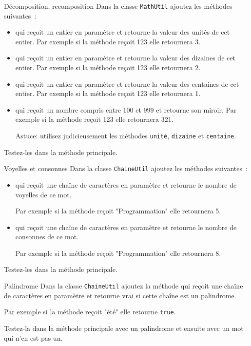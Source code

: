 \documentclass[a4paper,11pt]{style-esi/td}
\begin{document}
	\begin{Exercice}{Décomposition, recomposition}
		Dans la classe \texttt{MathUtil} ajoutez les méthodes suivantes~: 
		\begin{itemize}
			\item {} qui reçoit un entier en paramètre et retourne la valeur des unités de cet entier.
				Par exemple si la méthode reçoit 123 elle retournera 3.
			\item {} qui reçoit un entier en paramètre et retourne la valeur des dizaines de cet entier.
				Par exemple si la méthode reçoit 123 elle retournera 2.
			\item {} qui reçoit un entier en paramètre et retourne la valeur des centaines de cet entier.
				Par exemple si la méthode reçoit 123 elle retournera 1.
			\item {} qui reçoit un nombre compris entre 100 et 999 et retourne son miroir.
				Par exemple si la méthode reçoit 123 elle retournera 321.
				
				Astuce: utilisez judicieusement les méthodes \texttt{unité}, \texttt{dizaine} et \texttt{centaine}.
		\end{itemize}
		Testez-les dans la méthode principale.
	\end{Exercice} 
	
	\begin{Exercice}{Voyelles et consonnes}
		Dans la classe \texttt{ChaineUtil} ajoutez les méthodes suivantes~: 
		\begin{itemize}
			\item {} 
				qui reçoit une chaîne de caractères en paramètre et retourne le nombre de voyelles de ce mot.
				
				Par exemple si la méthode reçoit "Programmation" elle retournera 5.
			\item {} 
				qui reçoit une chaîne de caractères en paramètre et retourne le nombre de consonnes de ce mot.
				
				Par exemple si la méthode reçoit "Programmation" elle retournera 8.
		\end{itemize}
		Testez-les dans la méthode principale.
	\end{Exercice} 

	 \begin{Exercice}{Palindrome}
		Dans la classe \texttt{ChaineUtil} ajoutez la méthode 
		 qui reçoit une chaîne de caractères en paramètre et 
		retourne vrai si cette chaîne est un palindrome.
		
		Par exemple si la méthode reçoit "été" elle retourne \texttt{true}.
		
		Testez-la dans la méthode principale avec un palindrome et ensuite avec un mot qui n'en est pas un.
	\end{Exercice} 
\end{document}

